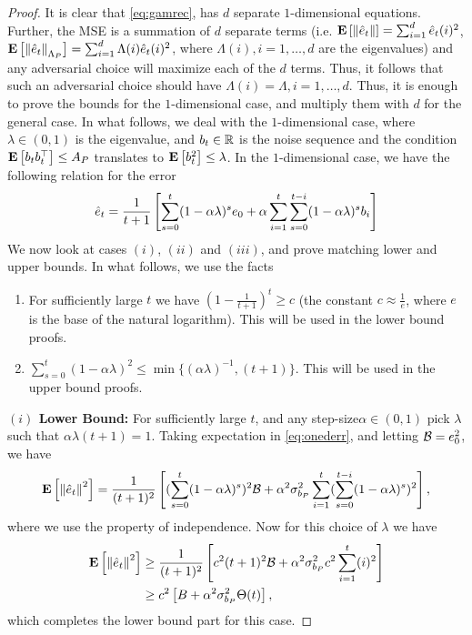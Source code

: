 \begin{proof}
It is clear that \eqref{eq:gamrec}, has $d$ separate $1$-dimensional equations. Further, the MSE is a summation of $d$ separate terms (i.e. $\mathbf{E}\left[\left\| \hat{e}_t\right\|\right]=\sum_{i=1}^d \hat{e}_t(i)^2$, $\mathbf{E}\left[\left\| \hat{e}_t\right\|_{\Lambda_P}\right]=\sum_{i=1}^d \Lambda(i) \hat{e}_t(i)^2$, where $\Lambda(i),i=1,\ldots, d$ are the eigenvalues) and any adversarial choice will maximize each of the $d$ terms. Thus, it follows that such an adversarial choice should have $\Lambda(i)=\Lambda, i=1,\ldots, d$. Thus, it is enough to prove the bounds for the $1$-dimensional case, and multiply them with $d$ for the general case. In what follows, we deal with the $1$-dimensional case, where $\lambda\in (0,1)$ is the eigenvalue, and $b_t\in \mathbb{R}$ is the noise sequence and the condition $\mathbf{E}\left[b_tb_t^\top\right]\leq A_P$ translates to $\mathbf{E}\left[b_t^2\right]\leq \lambda$. In the $1$-dimensional case, we have the following relation for the error
\begin{align}\label{eq:onederr}
\hat{e}_t=\frac{1}{t+1}\left[\sum_{s=0}^t (1-\alpha \lambda)^s e_0+ \alpha \sum_{i=1}^t \sum_{s=0}^{t-i} (1-\alpha \lambda)^s b_i\right]
\end{align}
We now look at cases $(i)$, $(ii)$ and $(iii)$, and prove matching lower and upper bounds. In what follows, we use the facts
\begin{enumerate}
\item For sufficiently large $t$ we have $(1-\frac{1}{t+1})^t\geq c$ (the constant $c\approx \frac{1}{e}$, where $e$ is the base of the natural logarithm). This will be used in the lower bound proofs.
\item $\sum_{s=0}^t(1-\alpha \lambda)^2\leq \min\{(\alpha\lambda)^{-1},(t+1)\}$. This will be used in the upper bound proofs.
 \end{enumerate}
\textbf{$(i)$ Lower Bound:}
 For sufficiently large $t$, and any step-size$\alpha \in (0,1)$ pick $\lambda$ such that $\alpha \lambda (t+1)=1$. Taking expectation in \eqref{eq:onederr}, and letting $\mathcal{B}=e_0^2$, we have
\begin{align}\label{eq:intererr}
\mathbf{E}\left[\left\| \hat{e}_t\right\|^2\right]=\frac{1}{(t+1)^2}\left[ (\sum_{s=0}^t(1-\alpha \lambda)^s)^2 \mathcal{B}+ \alpha^2\sigma^2_{b_P} \sum_{i=1}^t (\sum_{s=0}^{t-i} (1-\alpha \lambda)^s)^2\right],
\end{align}
where we use the property of independence. Now for this choice of $\lambda$ we have
\begin{align}
\mathbf{E}\left[\left\| \hat{e}_t\right\|^2\right]&\geq \frac{1}{(t+1)^2}\left[ c^2(t+1)^2 \mathcal{B}+ \alpha^2\sigma^2_{b_P} c^2\sum_{i=1}^t (i)^2\right]\\
&\geq c^2\left[B+ \alpha^2 \sigma^2_{b_P} \Theta(t) \right],
\end{align}
which completes the lower bound part for this case.


\end{proof}

